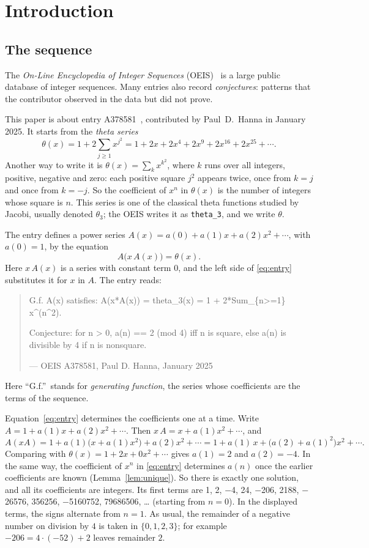 \documentclass[11pt,a4paper]{article}
\theoremstyle{definition}
\theoremstyle{remark}
\begin{document}
\section{Introduction}

\subsection{The sequence}\label{sec:sequence}
The \emph{On-Line Encyclopedia of Integer Sequences} (OEIS)~\cite{oeisdb} is a large public database of integer
sequences. Many
entries also record \emph{conjectures}: patterns that the contributor observed in the data but did not prove.

This paper is about entry A378581~\cite{oeis}, contributed by Paul~D.~Hanna in January 2025. It starts from the
\emph{theta series}
\[
\theta(x)=1+2\sum_{j\ge1}x^{j^2}=1+2x+2x^4+2x^9+2x^{16}+2x^{25}+\cdots .
\]
Another way to write it is $\theta(x)=\sum_{k}x^{k^2}$, where $k$ runs over all integers, positive, negative and zero:
each positive square $j^2$ appears twice, once from $k=j$ and once from $k=-j$. So the coefficient of $x^n$ in
$\theta(x)$ is the number of integers whose square is $n$. This series is one of the classical theta functions studied
by Jacobi, usually denoted $\theta_3$; the OEIS writes it as \texttt{theta\_3}, and we write $\theta$.

The entry defines a power series $A(x)=a(0)+a(1)x+a(2)x^2+\cdots$, with $a(0)=1$, by the equation
\begin{equation}\label{eq:entry}
A\bigl(x\,A(x)\bigr)=\theta(x) .
\end{equation}
Here $x\,A(x)$ is a series with constant term $0$, and the left side of \eqref{eq:entry} substitutes
it for $x$ in $A$. The entry reads:
\begin{quote}\small\ttfamily\raggedright G.f. A(x) satisfies: A(x*A(x)) = theta\_3(x) = 1 + 2*Sum\_\{n>=1\} x\^{}(n\^{}2).\par\smallskip Conjecture: for n > 0, a(n) == 2 (mod 4) iff n is square, else a(n) is divisible by 4 if n is nonsquare.\par\smallskip\hfill\textrm{--- OEIS A378581, Paul D. Hanna, January 2025}\end{quote}

Here ``G.f.''\ stands for \emph{generating function}, the series whose coefficients are the terms of the sequence.

Equation~\eqref{eq:entry} determines the coefficients one at a time. Write $A=1+a(1)x+a(2)x^2+\cdots$. Then
$x\,A=x+a(1)x^2+\cdots$, and
\[
A(xA)=1+a(1)\bigl(x+a(1)x^2\bigr)+a(2)x^2+\cdots=1+a(1)\,x+\bigl(a(2)+a(1)^2\bigr)x^2+\cdots .
\]
Comparing with $\theta(x)=1+2x+0x^2+\cdots$ gives $a(1)=2$ and $a(2)=-4$. In the same way, the coefficient
of $x^n$ in \eqref{eq:entry} determines $a(n)$ once the earlier coefficients are known (Lemma~\ref{lem:unique}). So
there is exactly one solution, and all its coefficients are integers. Its first terms are
1, 2, $-$4, 24, $-$206, 2188, $-$26576, 356256, $-$5160752, 79686506, \dots{} (starting from $n=0$). In the displayed terms, the signs alternate from $n=1$. As usual, the remainder of a negative number on division by $4$ is
taken in $\{0,1,2,3\}$; for example $-206=4\cdot(-52)+2$ leaves remainder $2$.
\end{document}
